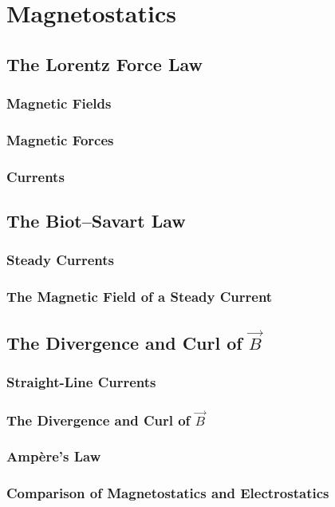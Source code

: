 \documentclass{article}
\begin{document}
\section{Magnetostatics}
\subsection{The Lorentz Force Law}
\subsubsection{Magnetic Fields}
\subsubsection{Magnetic Forces}
\subsubsection{Currents}

\subsection{The Biot--Savart Law}
\subsubsection{Steady Currents}
\subsubsection{The Magnetic Field of a Steady Current}

\subsection{The Divergence and Curl of $\vec{B}$}
\subsubsection{Straight-Line Currents}
\subsubsection{The Divergence and Curl of $\vec{B}$}
\subsubsection{Amp\`ere's Law}
\subsubsection{Comparison of Magnetostatics and Electrostatics}
\end{document}
